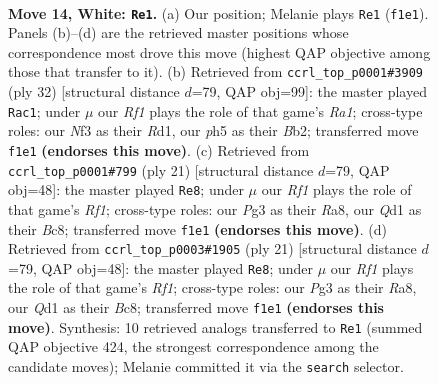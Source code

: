 \documentclass[11pt]{article}
\begin{document}
\clearpage

\begin{figure}[p]\centering
\begin{subfigure}{0.46\textwidth}\centering
\resizebox{\linewidth}{!}{%
\newchessgame
\chessboard[
  setfen={r1bqk1r1/5p2/1p2pnp1/p1b4p/5B1P/1P1B1NP1/P1P2P2/R2Q1RK1 w q - 2 14},
  showmover=false,
  pgfstyle=straightmove, color=movearrow, markmove={f1-e1}
]}
\caption{}
\end{subfigure}\hfill
\begin{subfigure}{0.46\textwidth}\centering
\resizebox{\linewidth}{!}{%
\newchessgame
\chessboard[
  setfen={r2r2k1/1pqb1ppp/p2bpn2/8/P1BN4/1P2P2P/1BQ2PP1/R2R2K1 w - - 3 17},
  showmover=false,
  pgfstyle=straightmove, color=movearrow, markmove={a1-c1}
]}
\caption{}
\end{subfigure}
\\[4pt]
\begin{subfigure}{0.46\textwidth}\centering
\resizebox{\linewidth}{!}{%
\newchessgame
\chessboard[
  setfen={r1bq1rk1/ppp2pp1/3b1n1p/5p1P/2BP4/2N1PN2/PPQ2PP1/R3K2R b KQ - 1 11},
  showmover=false,
  pgfstyle=straightmove, color=movearrow, markmove={f8-e8}
]}
\caption{}
\end{subfigure}\hfill
\begin{subfigure}{0.46\textwidth}\centering
\resizebox{\linewidth}{!}{%
\newchessgame
\chessboard[
  setfen={r1bq1rk1/ppp2pp1/3b1n1p/5p1P/2BP4/2N1PN2/PPQ2PP1/R3K2R b KQ - 1 11},
  showmover=false,
  pgfstyle=straightmove, color=movearrow, markmove={f8-e8}
]}
\caption{}
\end{subfigure}
\caption{\textbf{Move 14, White: \texttt{Re1}.} (a) Our position; Melanie plays \texttt{Re1} (\texttt{f1e1}). Panels (b)--(d) are the retrieved master positions whose correspondence most drove this move (highest QAP objective among those that transfer to it). (b) Retrieved from \texttt{ccrl\_top\_p0001\#3909} (ply 32) [structural distance $d$=79, QAP obj=99]: the master played \texttt{Rac1}; under $\mu$ our \emph{Rf1} plays the role of that game's \emph{Ra1}; cross-type roles: our \emph{N}f3 as their \emph{R}d1, our \emph{p}h5 as their \emph{B}b2; transferred move \texttt{f1e1} \textbf{(endorses this move)}. (c) Retrieved from \texttt{ccrl\_top\_p0001\#799} (ply 21) [structural distance $d$=79, QAP obj=48]: the master played \texttt{Re8}; under $\mu$ our \emph{Rf1} plays the role of that game's \emph{Rf1}; cross-type roles: our \emph{P}g3 as their \emph{R}a8, our \emph{Q}d1 as their \emph{B}c8; transferred move \texttt{f1e1} \textbf{(endorses this move)}. (d) Retrieved from \texttt{ccrl\_top\_p0003\#1905} (ply 21) [structural distance $d$=79, QAP obj=48]: the master played \texttt{Re8}; under $\mu$ our \emph{Rf1} plays the role of that game's \emph{Rf1}; cross-type roles: our \emph{P}g3 as their \emph{R}a8, our \emph{Q}d1 as their \emph{B}c8; transferred move \texttt{f1e1} \textbf{(endorses this move)}. Synthesis: 10 retrieved analogs transferred to \texttt{Re1} (summed QAP objective 424, the strongest correspondence among the candidate moves); Melanie committed it via the \texttt{search} selector.}
\label{fig:thought-m26}
\end{figure}
\end{document}
